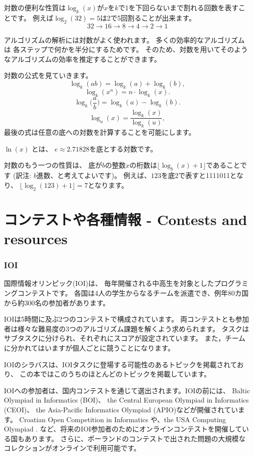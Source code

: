 対数の便利な性質は$\log_k(x)$が$x$を$k$で1を下回らないまで割れる回数を表すことです。
例えば$\log_2(32)=5$は2で5回割ることが出来ます。
\[32 \rightarrow 16 \rightarrow 8 \rightarrow 4 \rightarrow 2 \rightarrow 1 \]

アルゴリズムの解析には対数がよく使われます。
多くの効率的なアルゴリズムは
各ステップで何かを半分にするためです。
そのため、対数を用いてそのようなアルゴリズムの効率を推定することができます。

対数の公式を見ていきます。
\[\log_k(ab) = \log_k(a)+\log_k(b),\]
\[\log_k(x^n) = n \cdot \log_k(x).\]
\[\log_k\Big(\frac{a}{b}\Big) = \log_k(a)-\log_k(b).\]
\[\log_u(x) = \frac{\log_k(x)}{\log_k(u)},\]
最後の式は任意の底への対数を計算することを可能にします。



 $\ln(x)$ とは、
$e \approx 2.71828$を底とする対数です。

対数のもう一つの性質は、
底が$b$の整数$x$の桁数は$\lfloor \log_b(x)+1 \rfloor$であることです
(訳注: $b$進数、と考えてよいです)。
例えば、$123$を底$2$で表すと1111011となり、
$\lfloor \log_2(123)+1 \rfloor = 7$となります。

\section{コンテストや各種情報 - Contests and resources}

\subsubsection{IOI}

国際情報オリンピック(IOI)は、
毎年開催される中高生を対象としたプログラミングコンテストです。
各国は4人の学生からなるチームを派遣でき、例年80カ国から約300名の参加者があります。

IOIは5時間に及ぶ2つのコンテストで構成されています。
両コンテストとも参加者は様々な難易度の3つのアルゴリズム課題を解くよう求められます。
タスクはサブタスクに分けられ、それぞれにスコアが設定されています。
また，チームに分かれてはいますが個人ごとに競うことになります。

IOIのシラバス\cite{iois}は、IOIタスクに登場する可能性のあるトピックを掲載されており、
この本ではこのうちのほとんどのトピックを掲載しています。

IOIへの参加者は、国内コンテストを通じて選出されます。IOIの前には、
Baltic Olympiad in Informatics (BOI)、
the Central European Olympiad in Informatics (CEOI)、
the Asia-Pacific Informatics Olympiad (APIO)などが開催されています。
Croatian Open Competition in Informatics \cite{coci}
や、the USA Computing Olympiad \cite{usaco}.
など、将来のIOI参加者のためにオンラインコンテストを開催している国もあります。
さらに、ポーランドのコンテストで出された問題の大規模な
コレクションがオンラインで利用可能です\cite{main}。


